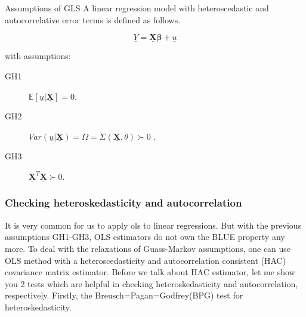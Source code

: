 \documentclass[
  12pt,
]{article}
\begin{document}
\begin{itembox}[1]{Assumptions of GLS}
A linear regression model with heteroscedastic and autocorrelative error terms is defined as follows.

$$
    \underline{Y} = \underline{\mathbf{X}}\mathbf{\beta} + \underline{u}
$$

with assumptions:

\begin{description}
\item[GH1] $\mathbb{E}[\underline{u}|\underline{\mathbf{X}}] = 0$.
\item[GH2] $Var(\underline{u}|\underline{\mathbf{X}}) = \Omega = \Sigma(\underline{\mathbf{X}}, \theta) \succ 0 $ . 
\item[GH3]  $\underline{\mathbf{X}}^{T}\underline{\mathbf{X}} \succ 0$.
\end{description}

\end{itembox}

\hypertarget{checking-heteroskedasticity-and-autocorrelation}{%
\subsubsection{Checking heteroskedasticity and autocorrelation}\label{checking-heteroskedasticity-and-autocorrelation}}

It is very common for us to apply ols to linear regressions. But with the previous assumptions GH1-GH3, OLS estimators do not own the BLUE property any more. To deal with the relaxations of Guass-Markov assumptions, one can use OLS method with a heteroscedasticity and autocorrelation consistent (HAC) covariance matrix estimator.
Before we talk about HAC estimator, let me show you 2 tests which are helpful in checking heteroskedasticity and autocorrelation, respectively.
Firstly, the Breusch=Pagan=Godfrey(BPG) test for heteroskedasticity.
\end{document}
